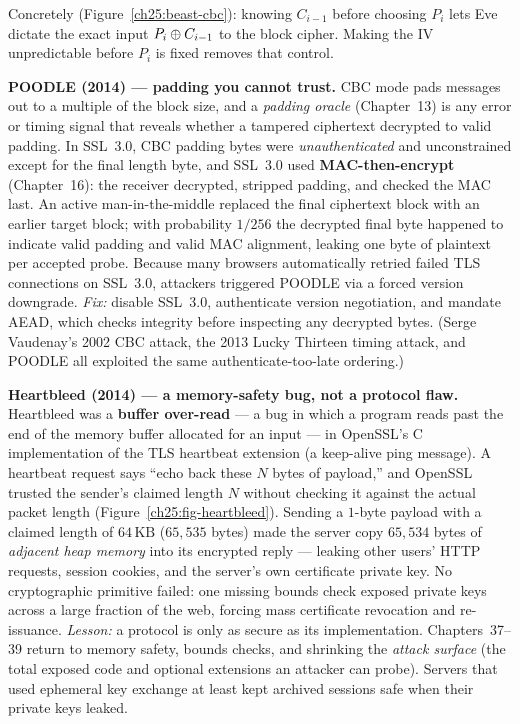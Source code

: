 Concretely (Figure~\ref{ch25:beast-cbc}): knowing $C_{i-1}$ before choosing $P_i$
lets Eve dictate the exact input $P_i \oplus C_{i-1}$ to the block cipher. Making the
IV unpredictable before $P_i$ is fixed removes that control.

\begin{attackbox}
\textbf{POODLE (2014) --- padding you cannot trust.} CBC mode pads messages out to a
multiple of the block size, and a \emph{padding oracle} (Chapter~13) is any error or
timing signal that reveals whether a tampered ciphertext decrypted to valid padding.
In SSL~3.0, CBC padding bytes were \emph{unauthenticated} and unconstrained except
for the final length byte, and SSL~3.0 used \textbf{MAC-then-encrypt} (Chapter~16):
the receiver decrypted, stripped padding, and checked the MAC last. An active
man-in-the-middle replaced the final ciphertext block with an earlier target block;
with probability $1/256$ the decrypted final byte happened to indicate valid padding
and valid MAC alignment, leaking one byte of plaintext per accepted probe. Because
many browsers automatically retried failed TLS connections on SSL~3.0, attackers
triggered POODLE via a forced version downgrade. \emph{Fix:} disable SSL~3.0,
authenticate version negotiation, and mandate AEAD, which checks integrity before
inspecting any decrypted bytes. (Serge Vaudenay's 2002 CBC attack, the 2013 Lucky
Thirteen timing attack, and POODLE all exploited the same authenticate-too-late
ordering.)
\end{attackbox}

\begin{attackbox}
\textbf{Heartbleed (2014) --- a memory-safety bug, not a protocol flaw.} Heartbleed
was a \textbf{buffer over-read} --- a bug in which a program reads past the end of
the memory buffer allocated for an input --- in OpenSSL's C implementation of the
TLS heartbeat extension (a keep-alive ping message). A heartbeat request says ``echo
back these $N$ bytes of payload,'' and OpenSSL trusted the sender's claimed length
$N$ without checking it against the actual packet length
(Figure~\ref{ch25:fig-heartbleed}). Sending a $1$-byte payload with a claimed length
of $64\,\text{KB}$ ($65{,}535$ bytes) made the server copy $65{,}534$ bytes of
\emph{adjacent heap memory} into its encrypted reply --- leaking other users' HTTP
requests, session cookies, and the server's own certificate private key. No
cryptographic primitive failed: one missing bounds check exposed private keys across
a large fraction of the web, forcing mass certificate revocation and re-issuance.
\emph{Lesson:} a protocol is only as secure as its implementation. Chapters~37--39
return to memory safety, bounds checks, and shrinking the \emph{attack surface} (the
total exposed code and optional extensions an attacker can probe). Servers that used
ephemeral key exchange at least kept archived sessions safe when their private keys
leaked.
\end{attackbox}


